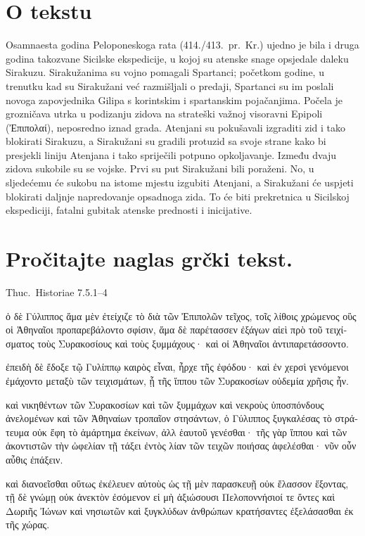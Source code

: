 


\section*{O tekstu}

Osamnaesta godina Peloponeskoga rata (414./413.\ pr.~Kr.) ujedno je bila i druga godina takozvane Sicilske ekspedicije, u kojoj su atenske snage opsjedale daleku Sirakuzu. Sirakužanima su vojno pomagali Spartanci; početkom godine, u trenutku kad su Sirakužani već razmišljali o predaji, Spartanci su im poslali novoga zapovjednika Gilipa s korintskim i spartanskim pojačanjima. Počela je grozničava utrka u podizanju zidova na strateški važnoj visoravni Epipoli \textgreek[variant=ancient]{(Ἐπιπολαί),} neposredno iznad grada. Atenjani su pokušavali izgraditi zid i tako blokirati Sirakuzu, a Sirakužani su gradili protuzid sa svoje strane kako bi presjekli liniju Atenjana i tako spriječili potpuno opkoljavanje. Između dvaju zidova sukobile su se vojske. Prvi su put Sirakužani bili poraženi. No, u sljedećemu će sukobu na istome mjestu izgubiti Atenjani, a Sirakužani će uspjeti blokirati daljnje napredovanje opsadnoga zida. To će biti prekretnica u Sicilskoj ekspediciji, fatalni gubitak atenske prednosti i inicijative.

\newpage

\section*{Pročitajte naglas grčki tekst.}

Thuc.\ Historiae 7.5.1–4


\medskip


{\large

\begin{greek}

\noindent ὁ δὲ Γύλιππος ἅμα μὲν ἐτείχιζε τὸ διὰ τῶν Ἐπιπολῶν τεῖχος, τοῖς λίθοις χρώμενος οὓς οἱ Ἀθηναῖοι προπαρεβάλοντο σφίσιν, ἅμα δὲ παρέτασσεν ἐξάγων αἰεὶ πρὸ τοῦ τειχίσματος τοὺς Συρακοσίους καὶ τοὺς ξυμμάχους· καὶ οἱ Ἀθηναῖοι ἀντιπαρετάσσοντο.

ἐπειδὴ δὲ ἔδοξε τῷ Γυλίππῳ καιρὸς εἶναι, ἦρχε τῆς ἐφόδου· καὶ ἐν χερσὶ γενόμενοι ἐμάχοντο μεταξὺ τῶν τειχισμάτων, ᾗ τῆς ἵππου τῶν Συρακοσίων οὐδεμία χρῆσις ἦν.

καὶ νικηθέντων τῶν Συρακοσίων καὶ τῶν ξυμμάχων καὶ νεκροὺς ὑποσπόνδους ἀνελομένων καὶ τῶν Ἀθηναίων τροπαῖον στησάντων, ὁ Γύλιππος ξυγκαλέσας τὸ στράτευμα οὐκ ἔφη τὸ ἁμάρτημα ἐκείνων, ἀλλ ἑαυτοῦ γενέσθαι· τῆς γὰρ ἵππου καὶ τῶν ἀκοντιστῶν τὴν ὠφελίαν τῇ τάξει ἐντὸς λίαν τῶν τειχῶν ποιήσας ἀφελέσθαι· νῦν οὖν αὖθις ἐπάξειν.

καὶ διανοεῖσθαι οὕτως ἐκέλευεν αὐτοὺς ὡς τῇ μὲν παρασκευῇ οὐκ ἔλασσον ἕξοντας, τῇ δὲ γνώμῃ οὐκ ἀνεκτὸν ἐσόμενον εἰ μὴ ἀξιώσουσι Πελοποννήσιοί τε ὄντες καὶ Δωριῆς Ἰώνων καὶ νησιωτῶν καὶ ξυγκλύδων ἀνθρώπων κρατήσαντες ἐξελάσασθαι ἐκ τῆς χώρας.

\end{greek}

}


